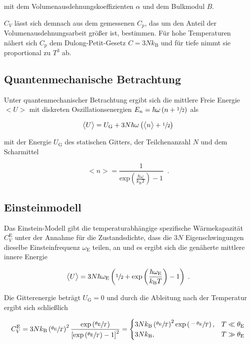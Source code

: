 mit dem Volumenausdehnungskoeffizienten $\alpha$ und dem Bulkmodul $B$.

$C_V$ lässt sich demnach aus dem gemessenen $C_p$, das um den Anteil der Volumenausdehnungsarbeit größer ist, bestimmen.
Für hohe Temperaturen nähert sich $C_p$ dem Dulong-Petit-Gesetz $C = 3 N k_\text{B}$ und für tiefe nimmt sie proportional
zu $T^3$ ab.

\subsection{Quantenmechanische Betrachtung}

Unter quantenmechanischer Betrachtung ergibt sich die mittlere Freie Energie $\bigl<U\bigr>$ mit diskreten
Oszillationsenergien $E_n = \hbar \omega \left(n + \sfrac{1}{2}\right)$ als

\begin{equation}
    \bigl<U\bigr> = U_\text{G} + 3N \hbar\omega \left(\bigl<n\bigr> + \sfrac{1}{2} \right) 
\end{equation}

mit der Energie $U_\text{G}$ des statischen Gitters, der Teilchenanzahl $N$ und dem Scharmittel

\begin{equation}
    \bigl<n\bigr> = \frac{1}{\text{exp}\left(\frac{\hbar \omega}{k_\text{B}T}\right)-1} \; \; .
\end{equation}

\subsection{Einsteinmodell}

Das Einstein-Modell gibt die temperaturabhängige spezifische Wärmekapazität $C_V^\text{E}$ unter der Annahme für die Zustandsdichte,
dass die $3N$ Eigenschwingungen dieselbe Einsteinfrequenz $\omega_\text{E}$ teilen, an und es ergibt sich die genäherte 
mittlere innere Energie

\begin{equation}
    \bigl<U\bigr> = 3N \hbar\omega_\text{E} \left(\sfrac{1}{2} + \text{exp}\left(\frac{\hbar \omega_\text{E}}{k_\text{B}T}\right)
     - 1\right) \; .
\end{equation}

Die  Gitterenergie beträgt $U_\text{G} = 0$ und durch die Ableitung nach der Temperatur ergibt sich schließlich

\begin{equation}
    C_V^\text{E} = 3Nk_\text{B} \left(\sfrac{\theta_\text{E}}{T}\right)^2 \frac{\text{exp}\left(\sfrac{\theta_\text{E}}{T}\right)}
    {\left[\text{exp}\left(\sfrac{\theta_\text{E}}{T}\right) - 1\right]^2} = 
    \begin{cases}
        3Nk_\text{B} \left(\sfrac{\theta_\text{E}}{T}\right)^2 \text{exp}\left(\sfrac{-\theta_\text{E}}{T}\right), 
        & T \ll \theta_\text{E} \\
        3Nk_\text{B} , & T \gg \theta_\text{E}
    \end{cases}
\end{equation}

